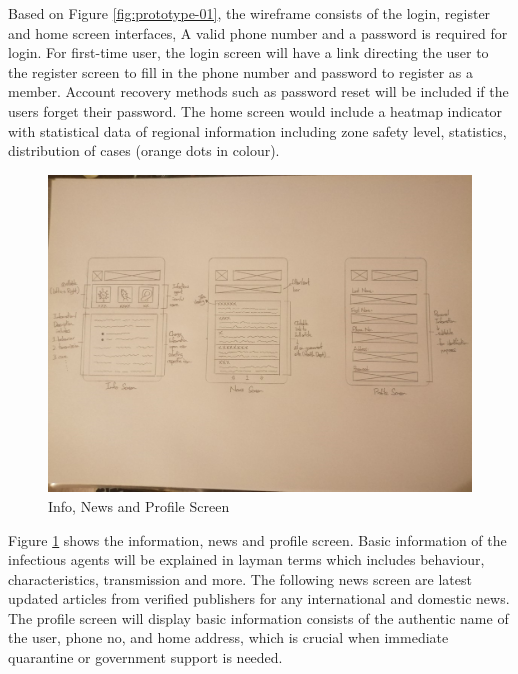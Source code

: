       \par Based on Figure \ref{fig:prototype-01}, the wireframe consists of the login, register and home screen interfaces, A valid phone number and a password is required for login. For first-time user, the login screen will have a link directing the user to the register screen to fill in the phone number and password to register as a member. Account recovery methods such as password reset will be included if the users forget their password. The home screen would include a heatmap indicator with statistical data of regional information including zone safety level, statistics, distribution of cases (orange dots in colour).
      
      \begin{figure}[H]
        \centering
        \includegraphics[width=\linewidth]{img/low-fidelity-prototype/sketch-2.png}
        \caption{Info, News and Profile Screen}
        \label{fig:prototype-02}
      \end{figure}

      \par Figure \ref{fig:prototype-02} shows the information, news and profile screen. Basic information of the infectious agents will be explained in layman terms which includes behaviour, characteristics, transmission and more. The following news screen are latest updated articles from verified publishers for any international and domestic news. The profile screen will display basic information consists of the authentic name of the user, phone no, and home address, which is crucial when immediate quarantine or government support is needed.

